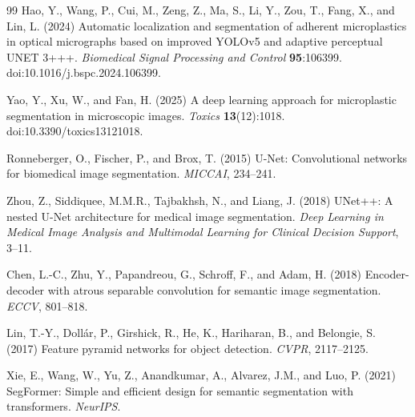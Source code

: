 \documentclass[11pt]{article}
\begin{document}
\begin{thebibliography}{99}
Hao, Y., Wang, P., Cui, M., Zeng, Z., Ma, S., Li, Y., Zou, T., Fang, X., and Lin, L. (2024) Automatic localization and segmentation of adherent microplastics in optical micrographs based on improved YOLOv5 and adaptive perceptual UNET 3+++. \textit{Biomedical Signal Processing and Control} \textbf{95}:106399. doi:10.1016/j.bspc.2024.106399.

Yao, Y., Xu, W., and Fan, H. (2025) A deep learning approach for microplastic segmentation in microscopic images. \textit{Toxics} \textbf{13}(12):1018. doi:10.3390/toxics13121018.

Ronneberger, O., Fischer, P., and Brox, T. (2015) U-Net: Convolutional networks for biomedical image segmentation. \textit{MICCAI}, 234--241.

Zhou, Z., Siddiquee, M.M.R., Tajbakhsh, N., and Liang, J. (2018) UNet++: A nested U-Net architecture for medical image segmentation. \textit{Deep Learning in Medical Image Analysis and Multimodal Learning for Clinical Decision Support}, 3--11.

Chen, L.-C., Zhu, Y., Papandreou, G., Schroff, F., and Adam, H. (2018) Encoder-decoder with atrous separable convolution for semantic image segmentation. \textit{ECCV}, 801--818.

Lin, T.-Y., Doll\'ar, P., Girshick, R., He, K., Hariharan, B., and Belongie, S. (2017) Feature pyramid networks for object detection. \textit{CVPR}, 2117--2125.

Xie, E., Wang, W., Yu, Z., Anandkumar, A., Alvarez, J.M., and Luo, P. (2021) SegFormer: Simple and efficient design for semantic segmentation with transformers. \textit{NeurIPS}.

\end{thebibliography}
\end{document}
